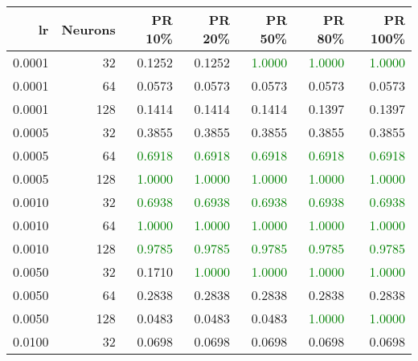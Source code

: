 \begin{tabular}{rrrrrrr}
\toprule
lr & Neurons & PR 10\% & PR 20\% & PR 50\% & PR 80\% & PR 100\% \\
\midrule
0.0001 & 32 & \textcolor{blu} {0.1252} & \textcolor{blu} {0.1252} & \textcolor{green} {1.0000} & \textcolor{green} {1.0000} & \textcolor{green} {1.0000} \\
0.0001 & 64 & \textcolor{blu} {0.0573} & \textcolor{blu} {0.0573} & \textcolor{blu} {0.0573} & \textcolor{blu} {0.0573} & \textcolor{blu} {0.0573} \\
0.0001 & 128 & \textcolor{blu} {0.1414} & \textcolor{blu} {0.1414} & \textcolor{blu} {0.1414} & \textcolor{blu} {0.1397} & \textcolor{blu} {0.1397} \\
0.0005 & 32 & \textcolor{blu} {0.3855} & \textcolor{blu} {0.3855} & \textcolor{blu} {0.3855} & \textcolor{blu} {0.3855} & \textcolor{blu} {0.3855} \\
0.0005 & 64 & \textcolor{green} {0.6918} & \textcolor{green} {0.6918} & \textcolor{green} {0.6918} & \textcolor{green} {0.6918} & \textcolor{green} {0.6918} \\
0.0005 & 128 & \textcolor{green} {1.0000} & \textcolor{green} {1.0000} & \textcolor{green} {1.0000} & \textcolor{green} {1.0000} & \textcolor{green} {1.0000} \\
0.0010 & 32 & \textcolor{green} {0.6938} & \textcolor{green} {0.6938} & \textcolor{green} {0.6938} & \textcolor{green} {0.6938} & \textcolor{green} {0.6938} \\
0.0010 & 64 & \textcolor{green} {1.0000} & \textcolor{green} {1.0000} & \textcolor{green} {1.0000} & \textcolor{green} {1.0000} & \textcolor{green} {1.0000} \\
0.0010 & 128 & \textcolor{green} {0.9785} & \textcolor{green} {0.9785} & \textcolor{green} {0.9785} & \textcolor{green} {0.9785} & \textcolor{green} {0.9785} \\
0.0050 & 32 & \textcolor{blu} {0.1710} & \textcolor{green} {1.0000} & \textcolor{green} {1.0000} & \textcolor{green} {1.0000} & \textcolor{green} {1.0000} \\
0.0050 & 64 & \textcolor{blu} {0.2838} & \textcolor{blu} {0.2838} & \textcolor{blu} {0.2838} & \textcolor{blu} {0.2838} & \textcolor{blu} {0.2838} \\
0.0050 & 128 & \textcolor{blu} {0.0483} & \textcolor{blu} {0.0483} & \textcolor{blu} {0.0483} & \textcolor{green} {1.0000} & \textcolor{green} {1.0000} \\
0.0100 & 32 & \textcolor{blu} {0.0698} & \textcolor{blu} {0.0698} & \textcolor{blu} {0.0698} & \textcolor{blu} {0.0698} & \textcolor{blu} {0.0698} \\

\end{tabular}
